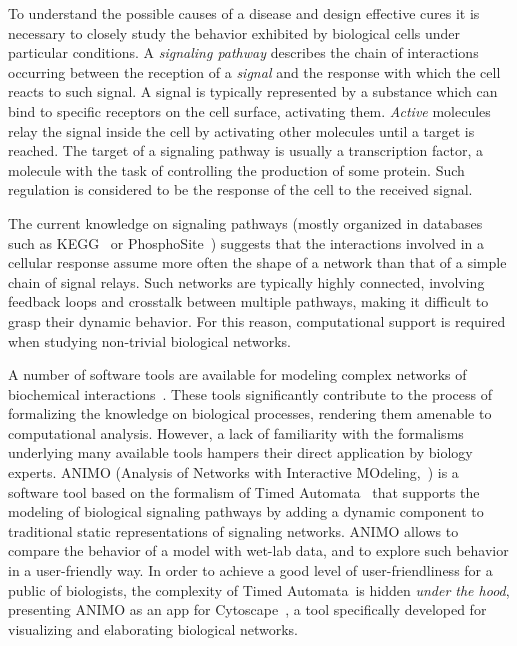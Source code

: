 \documentclass{llncs}
\newcommand{\tas}{Timed Automata}
\begin{document}
To understand the possible causes of a disease and design effective cures it is 
necessary to closely study the behavior exhibited by biological cells under particular conditions.
A \emph{signaling pathway} describes the chain of interactions occurring
between the reception of a \emph{signal} and the response with which the cell
reacts to such signal. 
A signal is typically represented by a substance which can bind
to specific receptors on the cell surface, activating them.
\emph{Active} molecules relay the signal inside the cell by activating
other molecules until a target is reached. The target of a signaling pathway is usually a transcription
factor, a molecule with the task of controlling the production of some protein. Such regulation is considered to be the response of the cell to the received signal.

The current knowledge on signaling pathways (mostly organized in databases such as KEGG~\cite{kegg}
or PhosphoSite~\cite{phosphosite}) suggests that the interactions involved in a cellular response assume more often
the shape of a network than that of a simple chain of signal relays.
Such networks are typically highly connected, involving feedback loops and crosstalk
between multiple pathways, making it difficult 
to grasp their dynamic behavior.
For this reason, computational support is required when studying non-trivial biological networks.

A number of software tools are available
for modeling complex networks of biochemical interactions~\cite{bio-pepa,blenx,copasi,e-cell,gna}.
These tools significantly contribute to the process of formalizing the knowledge on biological
processes, rendering them amenable to computational analysis.
However, a lack of familiarity with the formalisms underlying many available tools
hampers their direct application by biology experts.
ANIMO (Analysis of Networks with Interactive MOdeling,~\cite{animo-site,animo-ieee,animo-gene}) is a software tool
based on the formalism of \tas~\cite{timed-automata-alur} that supports the
modeling of biological signaling pathways
by adding a dynamic component to traditional static representations of signaling networks.
ANIMO allows to compare the behavior of
a model with wet-lab data, and to explore such behavior in a user-friendly way.
In order to achieve a good level of user-friendliness for a public of biologists, the complexity of \tas\ is hidden \emph{under the hood},
presenting ANIMO as an app for Cytoscape~\cite{cytoscape}, a tool specifically developed for visualizing 
and elaborating biological networks. %
\end{document}
